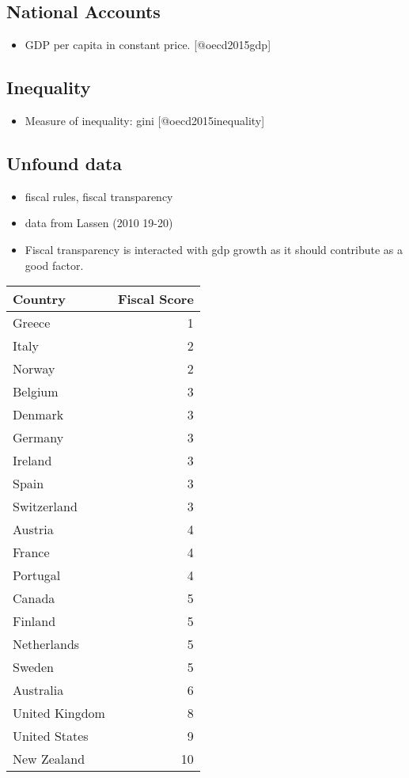 \documentclass[a4paper]{article}
\begin{document}
\subsection{National Accounts}
\label{sec-2-3}

\begin{itemize}
\item GDP per capita in constant price. [@oecd2015gdp]
\end{itemize}

\subsection{Inequality}
\label{sec-2-4}

\begin{itemize}
\item Measure of inequality: gini [@oecd2015inequality]
\end{itemize}

\subsection{Unfound data}
\label{sec-2-5}

\begin{itemize}
\item fiscal rules, fiscal transparency
\item data from Lassen (2010 19-20)
\item Fiscal transparency is interacted with gdp growth as it should
contribute as a good factor.
\end{itemize}

\begin{center}
\begin{tabular}{lr}
Country & Fiscal Score\\
\hline
Greece & 1\\
Italy & 2\\
Norway & 2\\
Belgium & 3\\
Denmark & 3\\
Germany & 3\\
Ireland & 3\\
Spain & 3\\
Switzerland & 3\\
Austria & 4\\
France & 4\\
Portugal & 4\\
Canada & 5\\
Finland & 5\\
Netherlands & 5\\
Sweden & 5\\
Australia & 6\\
United Kingdom & 8\\
United States & 9\\
New Zealand & 10\\
\end{tabular}
\end{center}
\end{document}
